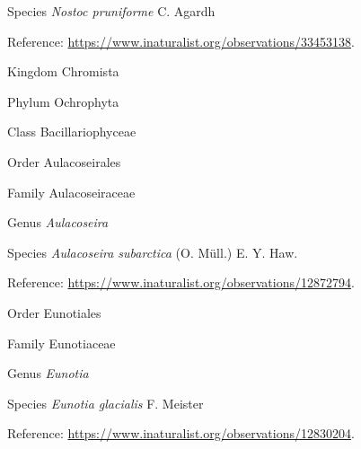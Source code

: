 \documentclass[9pt, article]{memoir}
\begin{document}
\begin{multicols}{2}
\vspace{6pt}\noindent\hspace{36pt}Species \textit{Nostoc pruniforme} C. Agardh


\vspace{6pt}Reference: 
\url{https://www.inaturalist.org/observations/33453138}.

\vspace{6pt}\noindent\hspace{0pt}Kingdom Chromista


\vspace{6pt}\noindent\hspace{6pt}Phylum Ochrophyta


\vspace{6pt}\noindent\hspace{12pt}Class Bacillariophyceae


\vspace{6pt}\noindent\hspace{18pt}Order Aulacoseirales


\vspace{6pt}\noindent\hspace{24pt}Family Aulacoseiraceae


\vspace{6pt}\noindent\hspace{30pt}Genus \textit{Aulacoseira}


\vspace{6pt}\noindent\hspace{36pt}Species \textit{Aulacoseira subarctica} (O. Müll.) E. Y. Haw.


\vspace{6pt}Reference: 
\url{https://www.inaturalist.org/observations/12872794}.

\vspace{6pt}\noindent\hspace{18pt}Order Eunotiales


\vspace{6pt}\noindent\hspace{24pt}Family Eunotiaceae


\vspace{6pt}\noindent\hspace{30pt}Genus \textit{Eunotia}


\vspace{6pt}\noindent\hspace{36pt}Species \textit{Eunotia glacialis} F. Meister


\vspace{6pt}Reference: 
\url{https://www.inaturalist.org/observations/12830204}.


\end{multicols}
\end{document}
